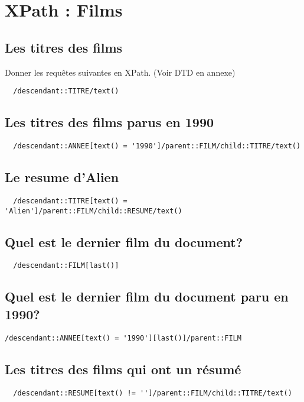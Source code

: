 \chapter{XPath : Films}
\section{Les titres des films}
Donner les requêtes suivantes en XPath.
(Voir DTD en annexe)

\begin{verbatim}
  /descendant::TITRE/text()
\end{verbatim}

\section{Les titres des films parus en 1990}
\begin{verbatim}
  /descendant::ANNEE[text() = '1990']/parent::FILM/child::TITRE/text()
\end{verbatim}

\section{Le resume d'Alien}
\begin{verbatim}
  /descendant::TITRE[text() = 'Alien']/parent::FILM/child::RESUME/text()
\end{verbatim}

\section{Quel est le dernier film du document?}
\begin{verbatim}
  /descendant::FILM[last()]
\end{verbatim}

\section{Quel est le dernier film du document paru en 1990?}
\begin{verbatim}
/descendant::ANNEE[text() = '1990'][last()]/parent::FILM
\end{verbatim}

\section{Les titres des films qui ont un résumé}
\begin{verbatim}
  /descendant::RESUME[text() != '']/parent::FILM/child::TITRE/text()
\end{verbatim}

